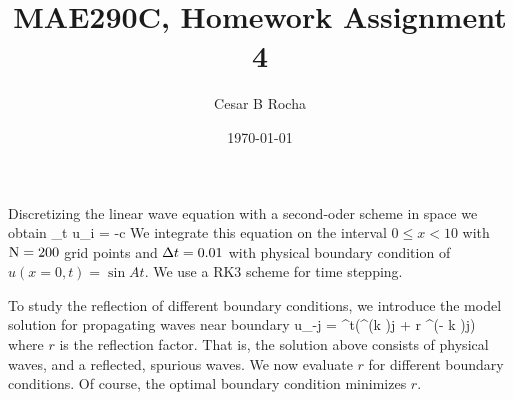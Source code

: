 \documentclass[11pt]{article}
\title{MAE290C, Homework Assignment 4}
\author{Cesar B Rocha}
\date{\today}
\begin{document}

\maketitle

Discretizing the linear wave equation with a second-oder scheme in space we obtain
\beq
\p_t u_i = -c \per
\eeq
We integrate this equation on the interval $0\leq x < 10$ with $\mathrm{N} = 200$ grid points 
and $\Delta t = 0.01$ with physical boundary condition of $u(x=0,t) = \sin A t$. We use a RK3 scheme
 for time stepping.

To study the reflection of different boundary conditions, we introduce the model solution for 
propagating waves near boundary
\beq
\label{model_eqn}
u_{\nmax-j} = \ee^{\ii \omega t}\left(\ee^{(\ii k \dx)j} + r \ee^{\ii (\pi - k \dx)j}\right)\com
\eeq
where $r$ is the reflection factor. That is, the solution above consists of physical waves, and a 
reflected, spurious waves. We now evaluate $r$ for different boundary conditions. Of course, the
optimal boundary condition minimizes $r$.
\end{document}

